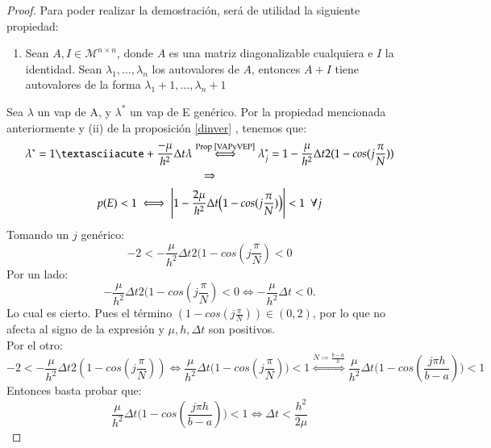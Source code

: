 \documentclass{endm}
\begin{document}
\begin{proof}
Para poder realizar la demostración, será de utilidad la siguiente propiedad:
\begin{enumerate} \label{sumvaps}
    \item Sean $A,I \in \mathcal{M}^{n \times n}$, donde $A$ es una matriz diagonalizable cualquiera e $I$ la identidad.
    Sean $\lambda_{1},\dots ,\lambda_{n}$ los autovalores de $A$, %
    entonces $A+I$ tiene %
    autovalores de la forma $\lambda_{1} +
    1,\dots ,\lambda_{n} + 1$ 
\end{enumerate}
    

Sea $\lambda$ un vap de A, y $\lambda^*$ un vap de E genérico. Por la propiedad mencionada anteriormente y (ii) de la proposici\'on \ref{dinver} , tenemos que:
\begin{gather*}
    \lambda^* = 1´+ \frac{-\mu}{h^2}\Delta t\lambda \overset{\text{Prop \ref{VAPyVEP}}}{\iff} \lambda^*_j = 1- \frac{\mu}{h^2}\Delta t2(1-cos(j\frac{\pi}{N}))\\
    \Rightarrow \\ 
    p(E) < 1 \iff \Bigg|1 - \frac{2\mu}{h^2}\Delta t \big(1-cos(j\frac{\pi}{N})\big) \Bigg| < 1 \ \ \forall j
\end{gather*}
Tomando un $j$ genérico:
\begin{equation*}
    -2 < -\frac{\mu}{h^2}\Delta t2(1-cos(j\frac{\pi}{N}) < 0
\end{equation*}
Por un lado:
\begin{equation}
     -\frac{\mu}{h^2}\Delta t2(1-cos(j\frac{\pi}{N}) < 0 \iff -\frac{\mu}{h^2}\Delta t < 0.
\end{equation}
  Lo cual es cierto. Pues el término $(1- cos(j\frac{\pi}{N})) \in (0,2)$, por lo que no afecta al signo de la expresión y $\mu,h,\Delta t$ son positivos.\\
Por el otro:
\begin{equation*}
  -2 < -\frac{\mu}{h^2}\Delta t2(1-cos(j\frac{\pi}{N})) \iff
  \frac{\mu}{h^2} \Delta t\big(1-cos(j\frac{\pi}{N})\big) < 1 \overset{N \coloneqq \frac{b-a}{h}}{\iff}
  \frac{\mu}{h^2}\Delta t\big(1-cos(\frac{j\pi h}{b-a})\big) < 1
\end{equation*}
Entonces basta probar que:
\begin{equation}
    \frac{\mu}{h^2}\Delta t\big(1-cos(\frac{j\pi h}{b-a})\big) < 1 \iff \Delta t < \frac{h^2}{2\mu}
\end{equation}

\end{proof}
\end{document}
